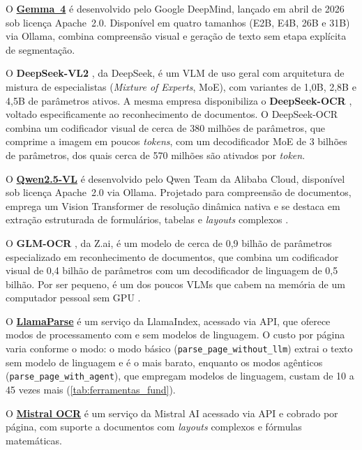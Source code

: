 \documentclass[noabntexcite,oneside]{ufsc-thesis-rn46-2019}
\begin{document}
O \href{https://ai.google.dev/gemma/docs/core}{\textbf{Gemma~4}}
\cite{gemma4_modelcard} é desenvolvido pelo Google DeepMind, lançado em abril de 2026
sob licença Apache~2.0. Disponível em quatro tamanhos (E2B, E4B, 26B e 31B) via Ollama,
combina compreensão visual e geração de texto sem etapa explícita de segmentação.

O \textbf{DeepSeek-VL2} \cite{wu2024deepseekvl2}, da DeepSeek, é um VLM de uso geral com
arquitetura de mistura de especialistas (\textit{Mixture of Experts}, MoE), com variantes de
1,0B, 2,8B e 4,5B de parâmetros ativos. A mesma empresa disponibiliza o
\textbf{DeepSeek-OCR} \cite{wei2025deepseekocr}, voltado especificamente ao reconhecimento
de documentos. O DeepSeek-OCR combina um codificador visual de cerca de 380 milhões de
parâmetros, que comprime a imagem em poucos \textit{tokens}, com um decodificador MoE de
3 bilhões de parâmetros, dos quais cerca de 570 milhões são ativados por \textit{token}.

O \href{https://github.com/QwenLM/Qwen2.5-VL}{\textbf{Qwen2.5-VL}} \cite{qwen2025vl}
é desenvolvido pelo Qwen Team da Alibaba Cloud, disponível sob licença Apache~2.0 via
Ollama. Projetado para compreensão de documentos, emprega um Vision Transformer de
resolução dinâmica nativa e se destaca em extração estruturada de formulários, tabelas e
\textit{layouts} complexos \cite{qwen2025vl}.

O \textbf{GLM-OCR} \cite{duan2026glmocr}, da Z.ai, é um modelo de cerca de 0,9 bilhão de
parâmetros especializado em reconhecimento de documentos, que combina um codificador
visual de 0,4 bilhão de parâmetros com um decodificador de linguagem de 0,5 bilhão. Por
ser pequeno, é um dos poucos VLMs que cabem na memória de um computador pessoal sem GPU
\cite{ollama_glmocr}.

O \href{https://www.llamaindex.ai/llamaparse}{\textbf{LlamaParse}}
\cite{llamaparse_pricing} é um serviço da LlamaIndex, acessado via API, que oferece modos
de processamento com e sem modelos de linguagem. O custo por página varia conforme o modo: o modo básico
(\texttt{parse\_page\_without\_llm}) extrai o texto sem modelo de linguagem e é o mais
barato, enquanto os modos agênticos (\texttt{parse\_page\_with\_agent}), que empregam
modelos de linguagem, custam de 10 a 45 vezes mais (\autoref{tab:ferramentas_fund}).

O \href{https://mistral.ai/news/mistral-ocr}{\textbf{Mistral OCR}} \cite{mistral2025}
é um serviço da Mistral AI acessado via API e cobrado por página, com suporte a
documentos com \textit{layouts} complexos e fórmulas matemáticas.
\end{document}

